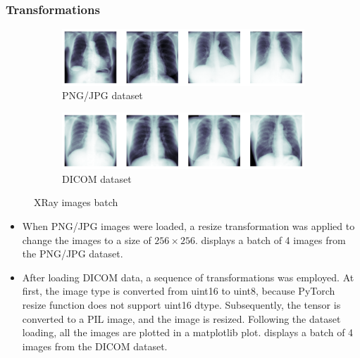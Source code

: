     \subsubsection*{Transformations}
        \begin{figure}[b]
            \begin{subfigure}[t]{\linewidth}
                \centering
                \includegraphics[width=\linewidth]{images/chest-xray-output.png}
                \caption{PNG/JPG dataset}
                \label{fig:png-image}    
            \end{subfigure}
            \begin{subfigure}[t]{\linewidth}
                \centering
                \includegraphics[width=\linewidth]{images/dicom.png}
                \caption{DICOM dataset}
                \label{fig:dicom-image}
            \end{subfigure}
            \caption{XRay images batch}
            \label{fig:xray-images}
        \end{figure}
        \begin{itemize}
            \item When PNG/JPG images were loaded, a resize transformation was applied to change the images to a size of $256 \times 256$.  displays a batch of 4 images from the PNG/JPG dataset.
            \item After loading DICOM data, a sequence of transformations was employed. At first, the image type is converted from uint16 to uint8, because PyTorch resize function does not support uint16 dtype. Subsequently, the tensor is converted to a PIL image, and the image is resized. Following the dataset loading, all the images are plotted in a matplotlib plot.  displays a batch of 4 images from the DICOM dataset.
        \end{itemize}
    